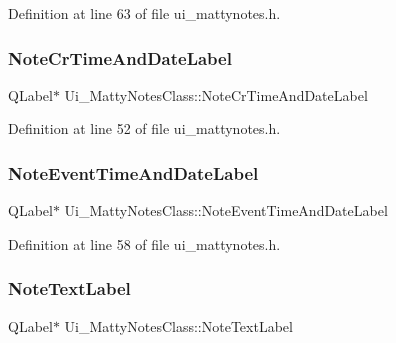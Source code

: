 Definition at line 63 of file ui\+\_\+mattynotes.\+h.

\hypertarget{classUi__MattyNotesClass_a809a1da050008644a0b8e986348d952d}{}\label{classUi__MattyNotesClass_a809a1da050008644a0b8e986348d952d} 
\subsubsection{\texorpdfstring{Note\+Cr\+Time\+And\+Date\+Label}{NoteCrTimeAndDateLabel}}
{\footnotesize\ttfamily Q\+Label$\ast$ Ui\+\_\+\+Matty\+Notes\+Class\+::\+Note\+Cr\+Time\+And\+Date\+Label}



Definition at line 52 of file ui\+\_\+mattynotes.\+h.

\hypertarget{classUi__MattyNotesClass_a6d8a5e072fade547f2bdd1ab5b1fa698}{}\label{classUi__MattyNotesClass_a6d8a5e072fade547f2bdd1ab5b1fa698} 
\subsubsection{\texorpdfstring{Note\+Event\+Time\+And\+Date\+Label}{NoteEventTimeAndDateLabel}}
{\footnotesize\ttfamily Q\+Label$\ast$ Ui\+\_\+\+Matty\+Notes\+Class\+::\+Note\+Event\+Time\+And\+Date\+Label}



Definition at line 58 of file ui\+\_\+mattynotes.\+h.

\hypertarget{classUi__MattyNotesClass_abcdc470e53acc292fcc388f84db2ac39}{}\label{classUi__MattyNotesClass_abcdc470e53acc292fcc388f84db2ac39} 
\subsubsection{\texorpdfstring{Note\+Text\+Label}{NoteTextLabel}}
{\footnotesize\ttfamily Q\+Label$\ast$ Ui\+\_\+\+Matty\+Notes\+Class\+::\+Note\+Text\+Label}



